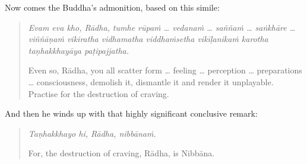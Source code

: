 Now comes the Buddha's admonition, based on this simile:

\begin{quote}
\emph{Evam eva kho, Rādha, tumhe rūpaṁ \ldots{} vedanaṁ \ldots{} saññaṁ \ldots{} saṅkhāre \ldots{} viññāṇaṁ vikiratha vidhamatha viddhaṁsetha vikīḷanikaṁ karotha taṇhakkhayāya paṭipajjatha.}

Even so, Rādha, you all scatter form \ldots{} feeling \ldots{} perception \ldots{} preparations \ldots{} consciousness, demolish it, dismantle it and render it unplayable. Practise for the destruction of craving.
\end{quote}

And then he winds up with that highly significant conclusive remark:

\begin{quote}
\emph{Taṇhakkhayo hi, Rādha, nibbānaṁ.}

For, the destruction of craving, Rādha, is Nibbāna.
\end{quote}
